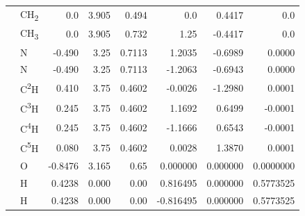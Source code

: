 \begin{table}[h]
\begin{centering}
\begin{tabular*}{1\linewidth}{@{\extracolsep{\fill}}llrrrrrr}
 & {\scriptsize{}CH\textsubscript{2}} & {\scriptsize{}0.0} & {\scriptsize{}3.905} & {\scriptsize{}0.494} & {\scriptsize{}0.0} & {\scriptsize{}0.4417} & {\scriptsize{}0.0}\tabularnewline
\addlinespace[-0.17em]
\addlinespace[-0.33em]
 & {\scriptsize{}CH\textsubscript{3}} & {\scriptsize{}0.0} & {\scriptsize{}3.905} & {\scriptsize{}0.732} & {\scriptsize{}1.25} & {\scriptsize{}-0.4417} & {\scriptsize{}0.0}\tabularnewline
\addlinespace[-0.17em]
\midrule 
\addlinespace[-0.33em]
{\scriptsize{}Pyrimidine \citep{jorgensen_relative_1990}} & {\scriptsize{}N} & {\scriptsize{}-0.490} & {\scriptsize{}3.25} & {\scriptsize{}0.7113} & {\scriptsize{}1.2035} & {\scriptsize{}-0.6989} & {\scriptsize{}0.0000}\tabularnewline
\addlinespace[-0.17em]
\addlinespace[-0.33em]
 & {\scriptsize{}N} & {\scriptsize{}-0.490} & {\scriptsize{}3.25} & {\scriptsize{}0.7113} & {\scriptsize{}-1.2063} & {\scriptsize{}-0.6943} & {\scriptsize{}0.0000}\tabularnewline
\addlinespace[-0.17em]
\addlinespace[-0.33em]
 & {\scriptsize{}C\textsuperscript{2}H} & {\scriptsize{}0.410} & {\scriptsize{}3.75} & {\scriptsize{}0.4602} & {\scriptsize{}-0.0026} & {\scriptsize{}-1.2980} & {\scriptsize{}0.0001}\tabularnewline
\addlinespace[-0.17em]
\addlinespace[-0.33em]
 & {\scriptsize{}C\textsuperscript{3}H} & {\scriptsize{}0.245} & {\scriptsize{}3.75} & {\scriptsize{}0.4602} & {\scriptsize{}1.1692} & {\scriptsize{}0.6499} & {\scriptsize{}-0.0001}\tabularnewline
\addlinespace[-0.17em]
\addlinespace[-0.33em]
 & {\scriptsize{}C\textsuperscript{4}H} & {\scriptsize{}0.245} & {\scriptsize{}3.75} & {\scriptsize{}0.4602} & {\scriptsize{}-1.1666} & {\scriptsize{}0.6543} & {\scriptsize{}-0.0001}\tabularnewline
\addlinespace[-0.17em]
\addlinespace[-0.33em]
 & {\scriptsize{}C\textsuperscript{5}H} & {\scriptsize{}0.080} & {\scriptsize{}3.75} & {\scriptsize{}0.4602} & {\scriptsize{}0.0028} & {\scriptsize{}1.3870} & {\scriptsize{}0.0001}\tabularnewline
\addlinespace[-0.17em]
\midrule 
\addlinespace[-0.33em]
{\scriptsize{}SPC/E \citep{SPC/E}} & {\scriptsize{}O} & {\scriptsize{}-0.8476} & {\scriptsize{}3.165} & {\scriptsize{}0.65} & {\scriptsize{}0.000000} & {\scriptsize{}0.000000} & {\scriptsize{}0.0000000}\tabularnewline
\addlinespace[-0.17em]
\addlinespace[-0.33em]
 & {\scriptsize{}H} & {\scriptsize{}0.4238} & {\scriptsize{}0.000} & {\scriptsize{}0.00} & {\scriptsize{}0.816495} & {\scriptsize{}0.000000} & {\scriptsize{}0.5773525}\tabularnewline
\addlinespace[-0.17em]
\addlinespace[-0.33em]
 & {\scriptsize{}H} & {\scriptsize{}0.4238} & {\scriptsize{}0.000} & {\scriptsize{}0.00} & {\scriptsize{}-0.816495} & {\scriptsize{}0.000000} & {\scriptsize{}0.5773525}\tabularnewline

\end{tabular*}
\end{centering}
\end{table}
